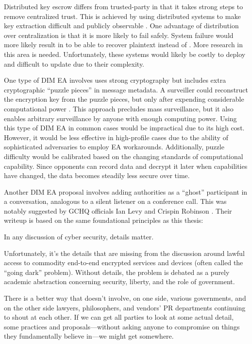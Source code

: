 Distributed key escrow differs from trusted-party in that it takes strong steps to remove centralized trust. This is
achieved by using distributed systems to make key extraction difficult and publicly observable \cite{phan_key_2017}
\cite{servan_schreiber_jje_2020}. One advantage of distribution over centralization is that it is more likely to fail
safely. System failure would more likely result in  to be able to recover plaintext instead of .
More research in this area is needed. Unfortunately, these systems would likely be costly to deploy and difficult to
update due to their complexity.

One type of \ac{DIM} \ac{EA} involves uses strong cryptography but includes extra cryptographic ``puzzle pieces'' in
message metadata. A surveiller could reconstruct the encryption key from the puzzle pieces, but only after expending
considerable computational power \cite{bellare_translucent_1996} \cite{wright_crypto_2018}. This approach precludes mass
surveillance, but it also enables arbitrary surveillance by anyone with enough computing power. Using this type of
\ac{DIM} \ac{EA} in common cases would be impractical due to its high cost. However, it would be less effective in
high-profile cases due to the ability of sophisticated adversaries to employ \ac{EA} workarounds. Additionally, puzzle
difficulty would be calibrated based on the changing standards of computational capability. Since opponents can record
data and decrypt it later when capabilities have changed, the data becomes steadily less secure over time.

Another \ac{DIM} \ac{EA} proposal involves adding authorities as a ``ghost'' participant in a conversation, analogous to
a silent listener on a conference call. This was notably suggested by \ac{GCHQ} officials Ian Levy and Crispin Robinson
\cite{levy_robinson_2018}. Their writeup is based on the same foundational principles as this thesis:

\begin{displayquote}
In any discussion of cyber security, details matter.

Unfortunately, it's the details that are missing from the discussion around lawful access to commodity end-to-end
encrypted services and devices (often called the ``going dark'' problem). Without details, the problem is debated as a
purely academic abstraction concerning security, liberty, and the role of government.

There is a better way that doesn’t involve, on one side, various governments, and on the other side lawyers,
philosophers, and vendors' PR departments continuing to shout at each other. If we can get all parties to look at some
actual detail, some practices and proposals---without asking anyone to compromise on things they fundamentally believe
in---we might get somewhere.
\cite{levy_robinson_2018}
\end{displayquote}

